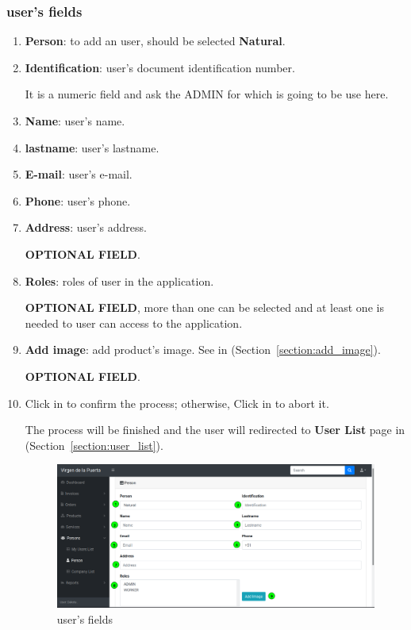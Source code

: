 \documentclass[a4paper,11pt]{refart}
\begin{document}
\subsubsection{user's fields}\label{section:user_form}
\begin{enumerate}
	\item \textbf{Person}: to add an user, should be selected \textbf{Natural}.
	\item \textbf{Identification}: user's document identification number.
		\medskip
		\begin{leftbar}
			It is a numeric field and ask the ADMIN for which is going to be use here.
		\end{leftbar}
	\item \textbf{Name}: user's name.
	\item \textbf{lastname}: user's lastname.
	\item \textbf{E-mail}: user's e-mail.
	\item \textbf{Phone}: user's phone.
	\item \textbf{Address}: user's address.
		\medskip
		\begin{leftbar}
			\textbf{OPTIONAL FIELD}.
		\end{leftbar}
	\item \textbf{Roles}: roles of user in the application.
	\medskip
	\begin{leftbar}
		\textbf{OPTIONAL FIELD}, more than one can be selected and at least one is needed to user can access to the application.
	\end{leftbar}
	\item \textbf{Add image}: add product's image. See in (Section~\ref{section:add_image}).
	\medskip
	\begin{leftbar}
		\textbf{OPTIONAL FIELD}.
	\end{leftbar}
	\item Click in  to confirm the process; otherwise, Click in  to abort it.
	\medskip
	\begin{leftbar}
		The process will be finished and the user will redirected to \textbf{User List} page in (Section~\ref{section:user_list}).
	\end{leftbar}
	\begin{figure}[H]\centering
		\includegraphics[width=\textwidth]{images/person_form-user-fields.png}
		\caption{user's fields}
		\label{fig:person_form-user-fields}
	\end{figure}
\end{enumerate}
\end{document}
